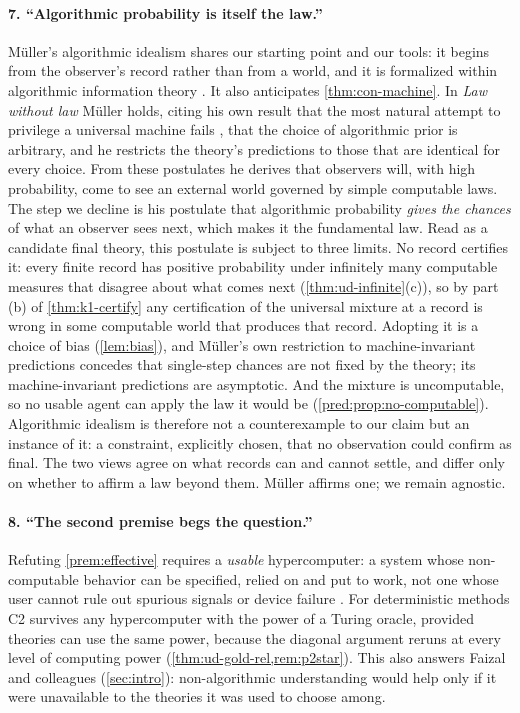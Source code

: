 \paragraph{7. ``Algorithmic probability is itself the law.''}
Müller's algorithmic idealism \citep{muller2026} shares our starting point and our tools: it begins from
the observer's record rather than from a world, and it is formalized within
algorithmic information theory \citep{muller2020}. It also anticipates \cref{thm:con-machine}. In
\emph{Law without law} \citep{muller2020} Müller holds, citing his own result that the most natural attempt to
privilege a universal machine fails \citep{muller2010}, that the choice of algorithmic prior is
arbitrary, and he restricts the theory's predictions to those that are identical for
every choice. From these postulates he derives that observers will, with high
probability, come to see an external world governed by simple computable laws. The
step we decline is his postulate that algorithmic probability \emph{gives the chances}
of what an observer sees next, which makes it the fundamental law. Read as a candidate
final theory, this postulate is subject to three limits. No
record certifies it: every finite record has positive probability under infinitely
many computable measures that disagree about what comes next
(\cref{thm:ud-infinite}(c)), so by part (b) of \cref{thm:k1-certify} any certification
of the universal mixture at a record is wrong in some computable world that produces
that record.
Adopting it is a choice of bias (\cref{lem:bias}), and Müller's own restriction to
machine-invariant predictions concedes that single-step chances are not fixed by the
theory; its machine-invariant predictions are asymptotic. And the mixture is uncomputable, so no usable agent can apply the law
it would be (\cref{pred:prop:no-computable}). Algorithmic idealism is therefore not a
counterexample to our claim but an instance of it: a constraint,
explicitly chosen, that no observation could confirm as final. The two views agree on
what records can and cannot settle, and differ only on whether to affirm a law beyond
them. Müller affirms one; we remain agnostic.

\paragraph{8. ``The second premise begs the question.''}
Refuting \cref{prem:effective} requires a \emph{usable} hypercomputer: a system whose
non-computable behavior can be specified, relied on and put to work, not one whose
user cannot rule out spurious signals or device failure \citep{earman-norton1993}.
For deterministic methods C2 survives any hypercomputer
with the power of a Turing oracle, provided theories can use the same power, because
the diagonal argument reruns at every level of computing power
(\cref{thm:ud-gold-rel,rem:p2star}). This also answers Faizal and colleagues (\cref{sec:intro}): non-algorithmic
understanding would help only if it were
unavailable to the theories it was used to choose among.

